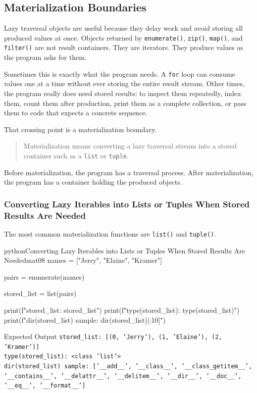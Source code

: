 \subsection{Materialization Boundaries}

Lazy traversal objects are useful because they delay work and avoid storing all produced values at once. Objects returned by \texttt{enumerate()}, \texttt{zip()}, \texttt{map()}, and \texttt{filter()} are not result containers. They are iterators. They produce values as the program asks for them.

Sometimes this is exactly what the program needs. A \texttt{for} loop can consume values one at a time without ever storing the entire result stream. Other times, the program really does need stored results: to inspect them repeatedly, index them, count them after production, print them as a complete collection, or pass them to code that expects a concrete sequence.

That crossing point is a materialization boundary.

\begin{quote}
Materialization means converting a lazy traversal stream into a stored container such as a \texttt{list} or \texttt{tuple}.
\end{quote}

Before materialization, the program has a traversal process. After materialization, the program has a container holding the produced objects.

\subsubsection{Converting Lazy Iterables into Lists or Tuples When Stored Results Are Needed}

The most common materialization functions are \texttt{list()} and \texttt{tuple()}.

\begin{codebox}[]{python}{Converting Lazy Iterables into Lists or Tuples When Stored Results Are Needed}{mat08}
names = ["Jerry", "Elaine", "Kramer"]

pairs = enumerate(names)

stored_list = list(pairs)

print(f"stored_list: {stored_list}")
print(f"type(stored_list): {type(stored_list)}")
print(f"dir(stored_list) sample: {dir(stored_list)[:10]}")
\end{codebox}


\begin{iobox}{Expected Output}
\texttt{stored\_list: [(0, 'Jerry'), (1, 'Elaine'), (2, 'Kramer')]} \\
\texttt{type(stored\_list): <class 'list'>} \\
\texttt{dir(stored\_list) sample: ['\_\_add\_\_', '\_\_class\_\_', '\_\_class\_getitem\_\_',} \\
\texttt{'\_\_contains\_\_', '\_\_delattr\_\_', '\_\_delitem\_\_', '\_\_dir\_\_', '\_\_doc\_\_',} \\
\texttt{'\_\_eq\_\_', '\_\_format\_\_']} \\
\end{iobox}


